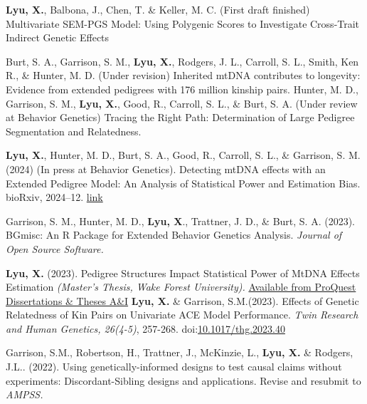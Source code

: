 

\begin{cvpublications}
  \cvpublication
    {\bullet \textbf{Lyu, X.}, Balbona, J., Chen, T. \& Keller, M. C. (First draft finished) Multivariate SEM-PGS Model: Using Polygenic Scores to Investigate Cross-Trait Indirect Genetic Effects} 

  \cvpublication
    {\bullet Burt, S. A., Garrison, S. M., \textbf{Lyu, X.}, Rodgers, J. L., Carroll, S. L., Smith, Ken R., \& Hunter, M. D. (Under revision) Inherited mtDNA contributes to longevity: Evidence from extended pedigrees with 176 million kinship pairs.}
  \cvpublication
    {\bullet Hunter, M. D., Garrison, S. M., \textbf{Lyu, X.}, Good, R., Carroll, S. L., \& Burt, S. A. (Under review at Behavior Genetics) Tracing the Right Path: Determination of Large Pedigree Segmentation and Relatedness. }

  \cvpublication
    {\bullet \textbf{Lyu, X.}, Hunter, M. D., Burt, S. A., Good, R., Carroll, S. L., \& Garrison, S. M. (2024) (In press at Behavior Genetics). Detecting mtDNA effects with an Extended Pedigree Model: An Analysis of Statistical Power and Estimation Bias. bioRxiv, 2024–12. \href{https://www.biorxiv.org/content/10.1101/2024.12.19.629449v1.abstract}{link}} 
    
  \cvpublication
    {\bullet Garrison, S. M., Hunter, M. D., \textbf{Lyu, X}., Trattner, J. D., \& Burt, S. A. (2023). BGmisc: An R Package for Extended Behavior Genetics Analysis. \textit{Journal of Open Source Software.}} 
    
  \cvpublication
    {\bullet \textbf{Lyu, X. }(2023). Pedigree Structures Impact Statistical Power of MtDNA Effects Estimation \textit{(Master's Thesis, Wake Forest University).} \href{https://www.proquest.com/docview/2863241367}{Available from ProQuest Dissertations \& Theses A\&I}}
  \cvpublication
    {\bullet \textbf{Lyu, X.} \& Garrison, S.M.(2023). Effects of Genetic Relatedness of Kin Pairs on Univariate ACE Model Performance. \textit{Twin Research and Human Genetics, 26(4-5)}, 257-268. doi:\href{https://www-cambridge-org.colorado.idm.oclc.org/core/journals/twin-research-and-human-genetics/article/effects-of-genetic-relatedness-of-kin-pairs-on-univariate-ace-model-performance/7B99A4A34DF4F54CDF2184676C4744AD}{10.1017/thg.2023.40}} 
    
  \cvpublication
    {\bullet Garrison, S.M., Robertson, H., Trattner, J., McKinzie, L., \textbf{Lyu, X.} \& Rodgers, J.L.. (2022). Using genetically-informed designs to test causal claims without experiments: Discordant-Sibling designs and applications. Revise and resubmit to \textit{AMPSS.}}   
    
\end{cvpublications}
